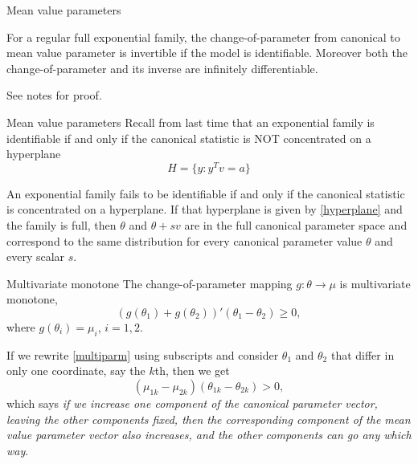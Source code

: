 \documentclass[
  ignorenonframetext,
]{beamer}
\begin{document}
\begin{frame}{Mean value parameters}
\protect\hypertarget{mean-value-parameters-1}{}
\begin{thm} \label{thm-mvp}
For a regular full exponential family, the change-of-parameter from canonical to mean value parameter is invertible if the model is identifiable. Moreover both the change-of-parameter and its inverse are infinitely differentiable.
\end{thm}

\vspace*{12pt}

See notes for proof.
\end{frame}

\begin{frame}{Mean value parameters}
\protect\hypertarget{mean-value-parameters-2}{}
Recall from last time that an exponential family is identifiable if and
only if the canonical statistic is NOT concentrated on a hyperplane
\begin{equation}\label{hyperplane}
  H = \{y : y^Tv = a\}  
\end{equation}

\vspace*{12pt}

\begin{thm}
An exponential family fails to be identifiable if and only if the canonical statistic is concentrated on a hyperplane. If that hyperplane is given by \eqref{hyperplane} and the family is full, then $\theta$ and $\theta+sv$ are in the full canonical parameter space and correspond to the same distribution for every canonical parameter value $\theta$ and every scalar $s$.     
\end{thm}
\end{frame}

\begin{frame}{Multivariate monotone}
\protect\hypertarget{multivariate-monotone}{}
The change-of-parameter mapping \(g:\theta\to\mu\) is multivariate
monotone, \begin{equation} \label{multiparm}
  (g(\theta_1) + g(\theta_2))'(\theta_1 - \theta_2) \geq 0,
\end{equation} where \(g(\theta_i) = \mu_i\), \(i = 1,2\).

If we rewrite \eqref{multiparm} using subscripts and consider
\(\theta_1\) and \(\theta_2\) that differ in only one coordinate, say
the \(k\)th, then we get \[
  (\mu_{1k} - \mu_{2k})(\theta_{1k} - \theta_{2k}) > 0,
\] which says
\emph{if we increase one component of the canonical parameter vector, leaving the other components fixed, then the corresponding component of the mean value parameter vector also increases, and the other components can go any which way}.
\end{frame}
\end{document}
